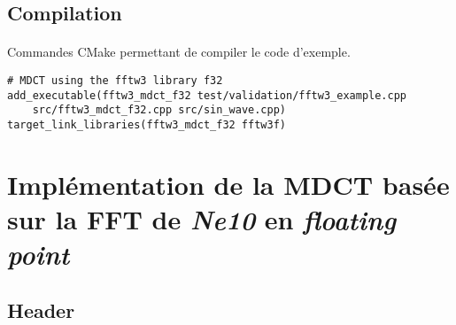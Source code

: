 \documentclass{article}
\begin{document}
\subsection{Compilation}\label{app:fftw3_example_compilation}
\paragraph{}
Commandes CMake permettant de compiler le code d'exemple.
\lstset{language=make}
\begin{lstlisting}
# MDCT using the fftw3 library f32
add_executable(fftw3_mdct_f32 test/validation/fftw3_example.cpp
    src/fftw3_mdct_f32.cpp src/sin_wave.cpp)
target_link_libraries(fftw3_mdct_f32 fftw3f)
\end{lstlisting}




\newpage
\section{Implémentation de la MDCT basée sur la FFT de \emph{Ne10} en \emph{floating point}}\label{app:mdct_ne10_f32}
\subsection{Header}\label{app:mdct_ne10_f32_header}
\end{document}
